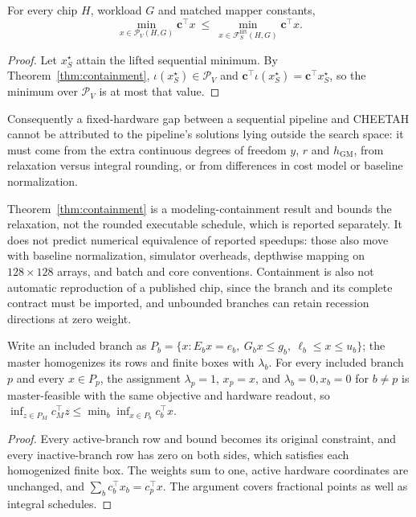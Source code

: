 \begin{corollary}\label{cor:optimum}
For every chip $H$, workload $G$ and matched mapper constants,
\begin{equation}
\min_{x\in\mathcal P_V(H,G)}\mathbf c^\top x\ \le\
\min_{x\in\mathcal F^{\mathrm{lift}}_S(H,G)}\mathbf c^\top x .
\label{eq:dominates}
\end{equation}
\end{corollary}
\begin{proof}
Let $x^\star_S$ attain the lifted sequential minimum.
By Theorem~\ref{thm:containment}, $\iota(x^\star_S)\in\mathcal P_V$ and $\mathbf c^\top\iota(x^\star_S)=\mathbf c^\top x^\star_S$, so the minimum over $\mathcal P_V$ is at most that value.
\end{proof}

Consequently a fixed-hardware gap between a sequential pipeline and CHEETAH cannot be attributed to the pipeline's solutions lying outside the search space: it must come from the extra continuous degrees of freedom $y$, $r$ and $h_{\mathrm{GM}}$, from relaxation versus integral rounding, or from differences in cost model or baseline normalization.

\begin{remark}[Scope]\label{rem:scope}
Theorem~\ref{thm:containment} is a modeling-containment result and bounds the relaxation, not the rounded executable schedule, which is reported separately.
It does not predict numerical equivalence of reported speedups: those also move with baseline normalization, simulator overheads, depthwise mapping on $128\times128$ arrays, and batch and core conventions.
Containment is also not automatic reproduction of a published chip, since the branch and its complete contract must be imported, and unbounded branches can retain recession directions at zero weight.
\end{remark}

\begin{corollary}\label{cor:branch_containment}
Write an included branch as $P_b=\{x:E_bx=e_b,\ G_bx\le g_b,\ \ell_b\le x\le u_b\}$; the master homogenizes its rows and finite boxes with $\lambda_b$.
For every included branch $p$ and every $x\in P_p$, the assignment $\lambda_p=1$, $x_p=x$, and $\lambda_b=0,x_b=0$ for $b\ne p$ is master-feasible with the same objective and hardware readout, so $\inf_{z\in P_M}c_M^\top z\le\min_b\inf_{x\in P_b}c_b^\top x$.
\end{corollary}
\begin{proof}
Every active-branch row and bound becomes its original constraint, and every inactive-branch row has zero on both sides, which satisfies each homogenized finite box.
The weights sum to one, active hardware coordinates are unchanged, and $\sum_bc_b^\top x_b=c_p^\top x$.
The argument covers fractional points as well as integral schedules.
\end{proof}

